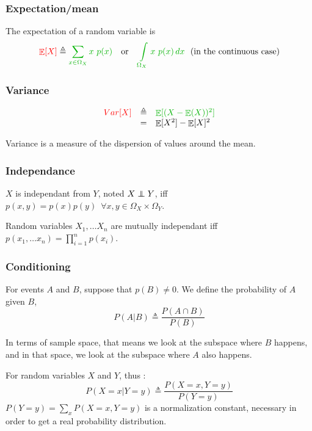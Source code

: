 \documentclass[12pt]{report}
\newcommand{\defobj}[1]{\color{red}#1\color{black}{}}
\newcommand{\defmean}[1]{\color{green!70!black}#1\color{black}{}}
\renewcommand{\emph}[1]{\color{violet}#1\color{black}{}}
\DeclareMathOperator{\E}{\mathbb{E}}
\newcommand\independent{\protect\mathpalette{\protect\independenT}{\perp}}
\def\independenT#1#2{\mathrel{\rlap{$#1#2$}\mkern2mu{#1#2}}}
\begin{document}
\subsubsection{Expectation/mean}
The \defobj{expectation} of a random variable is 
\[\defobj{\E[X]} \triangleq \defmean{\sum_{x\in\Omega_X}x\ p(x)} \quad \text{or} \quad \defmean{\int\displaylimits_{\Omega_X}x\ p(x) \mathop{dx}} \enspace \text{(in the continuous case)}\]

\subsubsection{Variance}

\[\begin{array}{lll}
\defobj{Var[X]} & \triangleq & \defmean{\E[(X-\E(X))^2]}\\
& = & \E[X^2] - \E[X]^2
\end{array}\]

Variance is a measure of the dispersion of values around the mean.

\subsubsection{Independance}

\defobj{$X$ is independant from $Y$}, noted \defobj{$X \independent Y$}, iff \defmean{$p(x,y) = p(x)p(y) \enspace \forall x, y\in \Omega_X\times \Omega_Y$}.

\noindent Random variables $X_1,\ldots X_n$ are \emph{mutually independant} iff $p(x_1,\ldots x_n) = \prod_{i=1}^n p(x_i)$.

\subsubsection{Conditioning}

For events $A$ and $B$, suppose that $p(B) \neq 0$. We define the
\defobj{probability of $A$ given $B$}, \defmean{\[P(A|B) \triangleq \frac{P(A
    \cap B) }{P(B)}\]}

In terms of sample space, that means we look at the subspace where $B$ happens,
and in that space, we look at the subspace where $A$ also happens.

For random variables $X$ and $Y$, thus :
\[P(X=x| Y=y) \triangleq \frac{P(X=x, Y=y)}{P(Y=y)}\]
$P(Y=y) = \sum_{x}P(X=x,Y=y)$ is a \emph{normalization constant}, necessary in order to get a real probability distribution.
\end{document}
